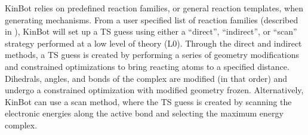 \documentclass[preprint, 11pt]{elsarticle} %
\begin{document}

KinBot relies on predefined reaction families, or general reaction templates, when generating mechanisms. 
From a user specified list of reaction families (described in \cite{kinbot:2019}), KinBot will set up a TS guess using either a ``direct'', ``indirect'', or ``scan'' strategy performed at a low level of theory (L0).
Through the direct and indirect methods, a TS guess is created by performing a series of geometry modifications and constrained optimizations to bring reacting atoms to a specified distance. 
Dihedrals, angles, and bonds of the complex are modified (in that order) and undergo a constrained optimization with modified geometry frozen.
Alternatively, KinBot can use a scan method, where the TS guess is created by scanning the electronic energies along the active bond and selecting the maximum energy complex.
\end{document}
